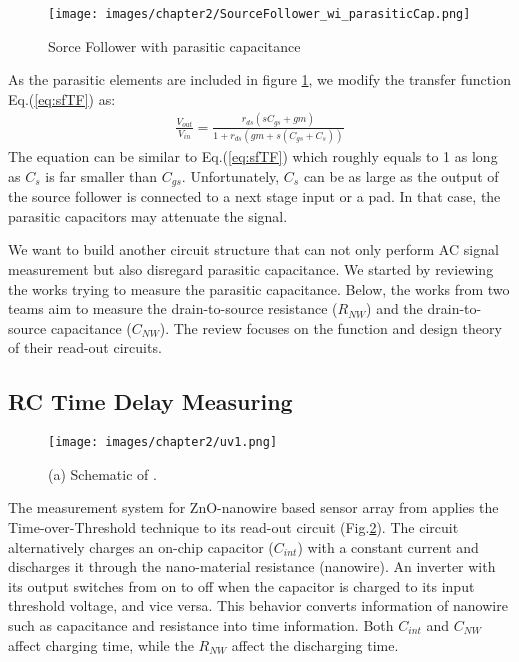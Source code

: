 \begin{figure}[ht]
    \centering
    \texttt{[image: images/chapter2/SourceFollower\_wi\_parasiticCap.png]}
    \fontsize{6}{7}\selectfont
    \caption{Sorce Follower with parasitic capacitance}
    \label{fig:SF_pC}
\end{figure}

As the parasitic elements are included in figure \ref{fig:SF_pC}, we modify the transfer function Eq.(\ref{eq:sfTF}) as:
\begin{align}
    \frac{V_{out}}{V_{in}} = \frac{r_{ds}(sC_{gs} + gm)}{1 + r_{ds}(gm + s(C_{gs}+C_s))}
\end{align}
The equation can be similar to Eq.(\ref{eq:sfTF}) which roughly equals to 1 as long as $C_s$ is far smaller than $C_{gs}$.
Unfortunately, $C_s$ can be as large as the output of the source follower is connected to a next stage input or a pad.
In that case, the parasitic capacitors may attenuate the signal.

We want to build another circuit structure that can not only perform AC signal measurement but also disregard parasitic capacitance.
We started by reviewing the works trying to measure the parasitic capacitance.
Below, the works from two teams aim to measure the drain-to-source resistance ($R_{NW}$) and the drain-to-source capacitance ($C_{NW}$).
The review focuses on the function and design theory of their read-out circuits.


\subsection{RC Time Delay Measuring}
\begin{figure}[!htbp]
    \centering
    \texttt{[image: images/chapter2/uv1.png]}
    \caption{(a) Schematic of \cite{Juv1}.}
    \label{fig:tot1}
\end{figure}

The measurement system for ZnO-nanowire based sensor array from \cite{Juv1} applies the Time-over-Threshold technique to its read-out circuit (Fig.\ref{fig:tot1}).
The circuit alternatively charges an on-chip capacitor ($C_{int}$) with a constant current and discharges it through the nano-material resistance (nanowire).
An inverter with its output switches from on to off when the capacitor is charged to its input threshold voltage, and vice versa.
This behavior converts information of nanowire such as capacitance and resistance into time information.
Both $C_{int}$ and $C_{NW}$ affect charging time, while the $R_{NW}$ affect the discharging time.

